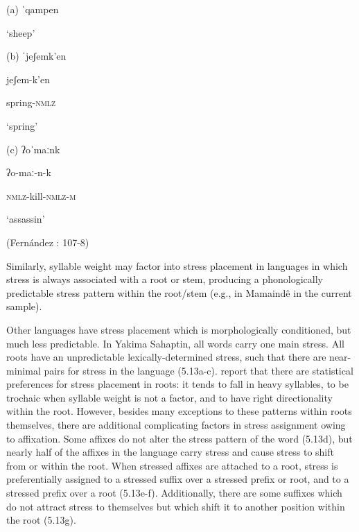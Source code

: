 (a)  ˈqampen



‘sheep’



(b)  ˈjeʃemk’en



jeʃem{}-k’en



spring-\textsc{nmlz}



‘spring’



(c)   ʔoˈmaːnk



ʔo{}-maː{}-n{}-k



\textsc{nmlz}{}-kill-\textsc{nmlz-m}



‘assassin’



(Fernández \citealt{Garay1998}: 107-8)


\z

Similarly, syllable weight may factor into stress placement in languages in which stress is always associated with a root or stem, producing a phonologically predictable stress pattern within the root/stem (e.g., in Mamaindê in the current sample).



  Other languages have stress placement which is morphologically conditioned, but much less predictable. In Yakima Sahaptin, all words carry one main stress. All roots have an unpredictable lexically-determined stress, such that there are near-minimal pairs for stress in the language (5.13a-c). \citet{HargusBeavert2005} report that there are statistical preferences for stress placement in roots: it tends to fall in heavy syllables, to be trochaic when syllable weight is not a factor, and to have right directionality within the root. However, besides many exceptions to these patterns within roots themselves, there are additional complicating factors in stress assignment owing to affixation. Some affixes do not alter the stress pattern of the word (5.13d), but nearly half of the affixes in the language carry stress and cause stress to shift from or within the root. When stressed affixes are attached to a root, stress is preferentially assigned to a stressed suffix over a stressed prefix or root, and to a stressed prefix over a root (5.13e-f). Additionally, there are some suffixes which do not attract stress to themselves but which shift it to another position within the root (5.13g).



